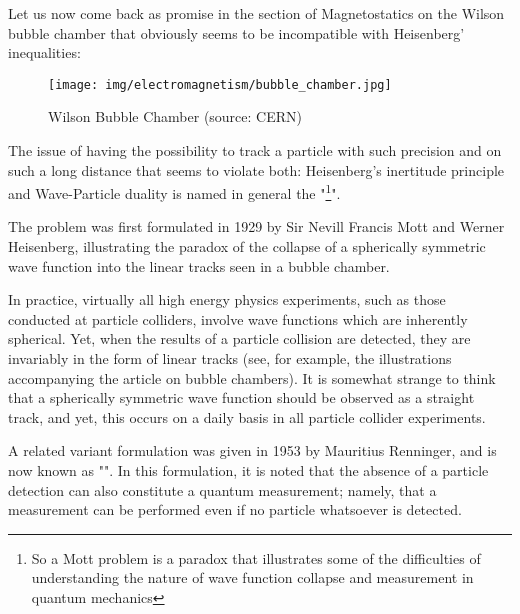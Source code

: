 	Let us now come back as promise in the section of Magnetostatics on the Wilson bubble chamber that obviously seems to be incompatible with Heisenberg' inequalities: 
	\begin{figure}[H]
		\centering
		\texttt{[image: img/electromagnetism/bubble\_chamber.jpg]}
		\caption[Wilson Bubble Chamber]{Wilson Bubble Chamber (source: CERN)}
	\end{figure}
	The issue of having the possibility to track a particle with such precision and on such a long distance that seems to violate both: Heisenberg's inertitude principle and Wave-Particle duality is named in general the "\footnote{So a Mott problem is a paradox that illustrates some of the difficulties of understanding the nature of wave function collapse and measurement in quantum mechanics}".

	The problem was first formulated in 1929 by Sir Nevill Francis Mott and Werner Heisenberg, illustrating the paradox of the collapse of a spherically symmetric wave function into the linear tracks seen in a bubble chamber.

	In practice, virtually all high energy physics experiments, such as those conducted at particle colliders, involve wave functions which are inherently spherical. Yet, when the results of a particle collision are detected, they are invariably in the form of linear tracks (see, for example, the illustrations accompanying the article on bubble chambers). It is somewhat strange to think that a spherically symmetric wave function should be observed as a straight track, and yet, this occurs on a daily basis in all particle collider experiments.

	A related variant formulation was given in 1953 by Mauritius Renninger, and is now known as "". In this formulation, it is noted that the absence of a particle detection can also constitute a quantum measurement; namely, that a measurement can be performed even if no particle whatsoever is detected.

